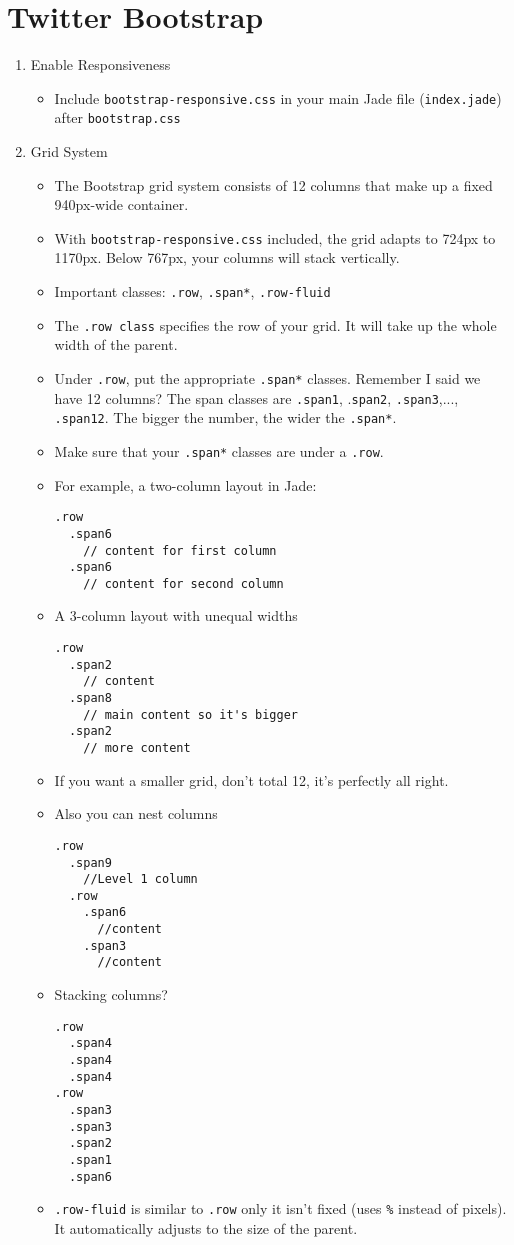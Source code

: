 \documentclass[12pt]{article}
\begin{document}
\section{Twitter Bootstrap}
\begin{enumerate}
\item Enable Responsiveness
\begin{itemize}
\item Include \texttt{bootstrap-responsive.css} in your main Jade file (\texttt{index.jade}) after \texttt{bootstrap.css}
\end{itemize}  

\item Grid System
\begin{itemize}
\item The Bootstrap grid system consists of 12 columns that make up a fixed 940px-wide container.
\item With \texttt{bootstrap-responsive.css} included, the grid adapts to 724px to 1170px.  Below 767px, your columns will stack vertically.
\item Important classes: \texttt{.row}, \texttt{.span*}, \texttt{.row-fluid}
\item The \texttt{.row class} specifies the row of your grid.  It will take up the whole width of the parent.
\item Under \texttt{.row}, put the appropriate \texttt{.span*} classes.  Remember I said we have 12 columns?  The span classes are \texttt{.span1}, .\texttt{span2}, \texttt{.span3},..., \texttt{.span12}.  The bigger the number, the wider the \texttt{.span*}.
\item Make sure that your \texttt{.span*} classes are under a \texttt{.row}.
\item For example, a two-column layout in Jade:
\begin{lstlisting}[frame=single]
.row
  .span6
    // content for first column
  .span6
    // content for second column
\end{lstlisting}
\item A 3-column layout with unequal widths
\begin{lstlisting}[frame=single]
.row
  .span2
    // content
  .span8
    // main content so it's bigger
  .span2
    // more content
\end{lstlisting}
\item If you want a smaller grid, don't total 12, it's perfectly all right.
\item Also you can nest columns
\begin{lstlisting}[frame=single]
.row
  .span9
    //Level 1 column
  .row
    .span6
      //content
    .span3
      //content
\end{lstlisting}
\item Stacking columns?
\begin{lstlisting}[frame=single]
.row
  .span4
  .span4
  .span4
.row
  .span3
  .span3
  .span2
  .span1
  .span6 
\end{lstlisting}
\item \texttt{.row-fluid} is similar to \texttt{.row} only it isn't fixed (uses \texttt{\%} instead of pixels).  It automatically adjusts to the size of the parent.
\end{itemize}


\end{enumerate}
\end{document}
